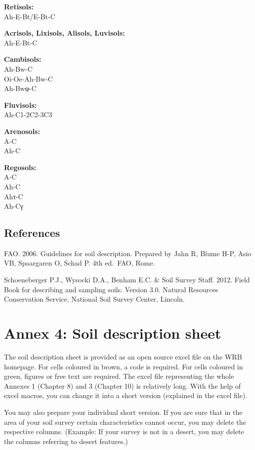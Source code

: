 \documentclass[
  letterpaper,
  DIV=11,
  numbers=noendperiod]{scrreprt}
\begin{document}
\textbf{Retisols:}\\
Ah-E-Bt/E-Bt-C

\textbf{Acrisols, Lixisols, Alisols, Luvisols:}\\
Ah-E-Bt-C

\textbf{Cambisols:}\\
Ah-Bw-C\\
Oi-Oe-Ah-Bw-C\\
Ah-Bwφ-C

\textbf{Fluvisols:}\\
Ah-C1-2C2-3C3

\textbf{Arenosols:}\\
A-C\\
Ah-C

\textbf{Regosols:}\\
A-C\\
Ah-C\\
Ahτ-C\\
Ah-Cγ

\hypertarget{references-3}{%
\section{References}\label{references-3}}

FAO. 2006. Guidelines for soil description. Prepared by Jahn R, Blume
H-P, Asio VB, Spaargaren O, Schad P. 4th ed.~FAO, Rome.

Schoeneberger P.J., Wysocki D.A., Benham E.C. \& Soil Survey Staff.
2012. Field Book for describing and sampling soils. Version 3.0. Natural
Resources Conservation Service, National Soil Survey Center, Lincoln.


\hypertarget{annex-4-soil-description-sheet}{%
\chapter{Annex 4: Soil description
sheet}\label{annex-4-soil-description-sheet}}

The soil description sheet is provided as an open source excel file on
the WRB homepage. For cells coloured in brown, a code is required. For
cells coloured in green, figures or free text are required. The excel
file representing the whole Annexes 1 (Chapter 8) and 3 (Chapter 10) is
relatively long. With the help of excel macros, you can change it into a
short version (explained in the excel file).

You may also prepare your individual short version. If you are sure that
in the area of your soil survey certain characteristics cannot occur,
you may delete the respective columns. (Example: If your survey is not
in a desert, you may delete the columns referring to desert features.)
\end{document}
